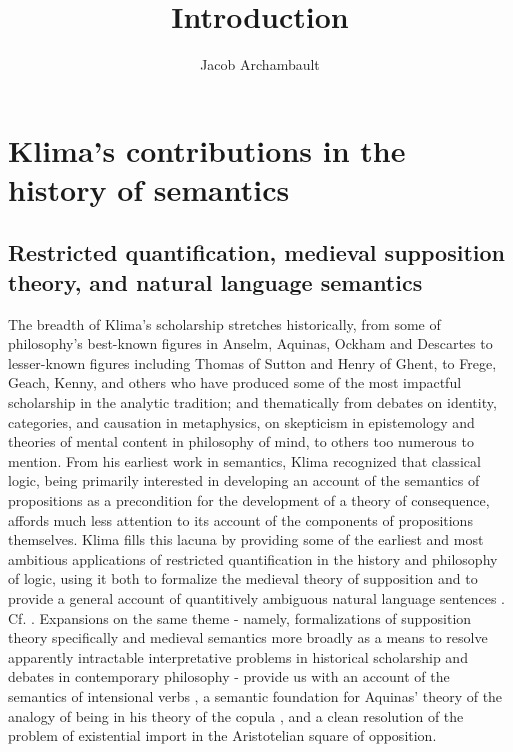 \documentclass[]{article}
\title{Introduction}
\author{Jacob Archambault}
\begin{document}
\maketitle

\section{Klima's contributions in the history of semantics}
\subsection{Restricted quantification, medieval supposition theory, and natural language semantics}
The breadth of Klima's scholarship stretches 
historically, from some of philosophy's best-known figures in Anselm, Aquinas, Ockham and Descartes 
to lesser-known figures including Thomas of Sutton and Henry of Ghent, 
to Frege, Geach, Kenny, and others who have produced some of the most impactful scholarship in the analytic tradition; 
and 
thematically from debates 
on identity, categories, and causation in metaphysics, 
on skepticism in epistemology and theories of mental content in philosophy of mind, 
to others too numerous to mention. 
From his earliest work in semantics, 
Klima recognized that classical logic, 
being primarily interested in developing an account of the semantics of propositions as a precondition for the development of a theory of consequence, 
affords much less attention to its account of the components of propositions themselves.
Klima fills this lacuna by providing some of the earliest and most ambitious applications of restricted quantification in the history and philosophy of logic, 
using it both to formalize the medieval theory of supposition 
and to provide a general account of quantitively ambiguous natural language sentences \autocite{Klima1988,Klima1990,KlimaSandu1990,Klima1991b}. Cf. \autocite{Parsons2014}. 
Expansions on the same theme - 
namely, formalizations of supposition theory specifically 
and medieval semantics more broadly 
as a means to resolve apparently intractable interpretative problems in historical scholarship 
and debates in contemporary philosophy - 
provide us with an account of the semantics of intensional verbs \autocite{Klima1991}, 
a semantic foundation for Aquinas' theory of the analogy of being in his theory of the copula \autocite{Klima1996,Klima2002}, 
and a clean resolution of the problem of existential import in the Aristotelian square of opposition\autocite{Klima2001}. 
\end{document}
